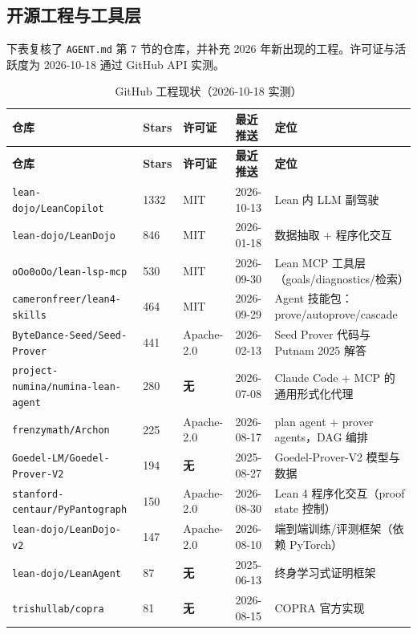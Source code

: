 \documentclass[UTF8,a4paper,11pt,fontset=windows]{ctexart}
\newcommand{\code}[1]{\texttt{#1}}
\begin{document}
\subsection{开源工程与工具层}\label{sec:github}

下表复核了 \code{AGENT.md} 第 7 节的仓库，并补充 2026 年新出现的工程。许可证与活跃度为 2026-10-18 通过 GitHub API 实测。

{\footnotesize
\begin{longtable}{@{}L{4.9cm}L{0.9cm}L{1.9cm}L{1.9cm}L{5.4cm}@{}}
\caption{GitHub 工程现状（2026-10-18 实测）}\label{tab:repos}\\
\toprule
\textbf{仓库} & \textbf{Stars} & \textbf{许可证} & \textbf{最近推送} & \textbf{定位} \\
\midrule
\endfirsthead
\toprule
\textbf{仓库} & \textbf{Stars} & \textbf{许可证} & \textbf{最近推送} & \textbf{定位} \\
\midrule
\endhead
\bottomrule
\endfoot
\code{lean-dojo/LeanCopilot} & 1332 & MIT & 2026-10-13 & Lean 内 LLM 副驾驶 \cite{leancopilot} \\
\code{lean-dojo/LeanDojo} & 846 & MIT & 2026-01-18 & 数据抽取 + 程序化交互 \cite{leandojo} \\
\code{oOo0oOo/lean-lsp-mcp} & 530 & MIT & 2026-09-30 & Lean MCP 工具层（goals/diagnostics/检索） \\
\code{cameronfreer/lean4-skills} & 464 & MIT & 2026-09-29 & Agent 技能包：prove/autoprove/cascade \\
\code{ByteDance-Seed/Seed-Prover} & 441 & Apache-2.0 & 2026-02-13 & Seed Prover 代码与 Putnam 2025 解答 \cite{seedprover} \\
\code{project-numina/\allowbreak numina-lean-agent} & 280 & \textbf{无} & 2026-07-08 & Claude Code + MCP 的通用形式化代理 \cite{numina} \\
\code{frenzymath/Archon} & 225 & Apache-2.0 & 2026-08-17 & plan agent + prover agents，DAG 编排 \cite{archon} \\
\code{Goedel-LM/Goedel-Prover-V2} & 194 & \textbf{无} & 2025-08-27 & Goedel-Prover-V2 模型与数据 \cite{goedelv2} \\
\code{stanford-centaur/PyPantograph} & 150 & Apache-2.0 & 2026-08-30 & Lean 4 程序化交互（proof state 控制） \\
\code{lean-dojo/LeanDojo-v2} & 147 & Apache-2.0 & 2026-08-10 & 端到端训练/评测框架（依赖 PyTorch） \\
\code{lean-dojo/LeanAgent} & 87 & \textbf{无} & 2025-06-13 & 终身学习式证明框架 \\
\code{trishullab/copra} & 81 & \textbf{无} & 2026-08-15 & COPRA 官方实现 \cite{copra} \\

\end{longtable}}
\end{document}
